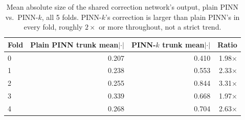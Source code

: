 \begin{table}[H]
\centering
\scriptsize
\begin{tabular}{lrrr}
\toprule
Fold & Plain PINN trunk mean$|\cdot|$ & PINN-$k$ trunk mean$|\cdot|$ & Ratio \\
\midrule
0 & 0.207 & 0.410 & 1.98$\times$ \\
1 & 0.238 & 0.553 & 2.33$\times$ \\
2 & 0.255 & 0.844 & 3.31$\times$ \\
3 & 0.339 & 0.668 & 1.97$\times$ \\
4 & 0.268 & 0.704 & 2.63$\times$ \\
\bottomrule
\end{tabular}
\caption{\small{Mean absolute size of the shared correction network's output, plain PINN vs.\
PINN-$k$, all 5 folds. PINN-$k$'s correction is larger than plain PINN's in every fold,
roughly $2\times$ or more throughout, not a strict trend.}}
\label{tab:trunk-residual}
\end{table}

